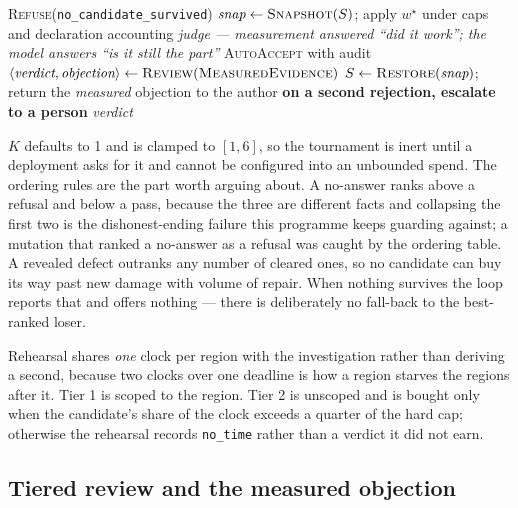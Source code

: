 \documentclass[10pt,onecolumn]{article}
\newcommand{\code}[1]{\texttt{\small #1}}
\begin{document}
\begin{algorithm}[H]
\begin{algorithmic}[1]
\Statex \hfill {}
 \Return \textsc{Refuse}(\code{no\_candidate\_survived}) 
\EndIf
\State $\textit{snap} \gets \textsc{Snapshot}(S)$; apply $w^\star$ under caps and declaration accounting
\Statex \textit{judge --- measurement answered ``did it work''; the model answers ``is it still the part''}
  \State \textsc{AutoAccept} with audit 
\Else
  \State $\langle \textit{verdict}, \textit{objection} \rangle \gets \textsc{Review}(\textsc{MeasuredEvidence})$
  \Statex \hfill {}
    \State $S \gets \textsc{Restore}(\textit{snap})$; return the \emph{measured} objection to the author
    \State \textbf{on a second rejection, escalate to a person} 
  \EndIf
\EndIf
\State \Return \textit{verdict} 
\end{algorithmic}
\end{algorithm}

$K$ defaults to 1 and is clamped to $[1,6]$, so the tournament is inert until a deployment asks for
it and cannot be configured into an unbounded spend. The ordering rules are the part worth arguing
about. A no-answer ranks above a refusal and below a pass, because the three are different facts
and collapsing the first two is the dishonest-ending failure this programme keeps guarding against;
a mutation that ranked a no-answer as a refusal was caught by the ordering table. A revealed defect
outranks any number of cleared ones, so no candidate can buy its way past new damage with volume of
repair. When nothing survives the loop reports that and offers nothing --- there is deliberately no
fall-back to the best-ranked loser.

Rehearsal shares \emph{one} clock per region with the investigation rather than deriving a second,
because two clocks over one deadline is how a region starves the regions after it. Tier 1 is scoped
to the region. Tier 2 is unscoped and is bought only when the candidate's share of the clock
exceeds a quarter of the hard cap; otherwise the rehearsal records \code{no\_time} rather than a
verdict it did not earn.

\subsection{Tiered review and the measured objection}\label{sec:tiered}
\end{document}
